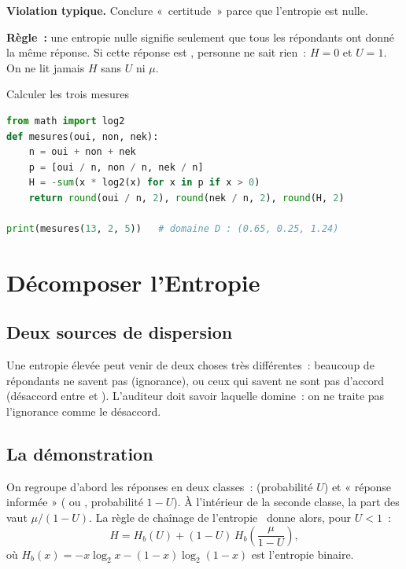\begin{boxalert}
\textbf{Violation typique.} Conclure «~certitude~» parce que l'entropie est
nulle.

\smallskip
\textbf{Règle~:} une entropie nulle signifie seulement que tous les
répondants ont donné la même réponse. Si cette réponse est \NEK{}, personne
ne sait rien~: $H = 0$ et $U = 1$. On ne lit jamais $H$ sans $U$ ni $\mu$.
\end{boxalert}

\begin{boxoutils}{Calculer les trois mesures}
\begin{lstlisting}[language=Python]
from math import log2
def mesures(oui, non, nek):
    n = oui + non + nek
    p = [oui / n, non / n, nek / n]
    H = -sum(x * log2(x) for x in p if x > 0)
    return round(oui / n, 2), round(nek / n, 2), round(H, 2)

print(mesures(13, 2, 5))   # domaine D : (0.65, 0.25, 1.24)
\end{lstlisting}
\end{boxoutils}

\section{Décomposer l'Entropie}
\label{sec:c11-decomp}

\subsection{Deux sources de dispersion}

Une entropie élevée peut venir de deux choses très différentes~: beaucoup
de répondants ne savent pas (ignorance), ou ceux qui savent ne sont pas
d'accord (désaccord entre \OUI{} et \NON{}). L'auditeur doit savoir
laquelle domine~: on ne traite pas l'ignorance comme le désaccord.

\subsection{La démonstration}

On regroupe d'abord les réponses en deux classes~: \NEK{} (probabilité $U$)
et « réponse informée » (\OUI{} ou \NON{}, probabilité $1 - U$). À
l'intérieur de la seconde classe, la part des \OUI{} vaut $\mu / (1 - U)$.
La règle de chaînage de l'entropie~\cite{shannon1948,cover2006elements}
donne alors, pour $U < 1$~:
\[
    H = H_b(U) + (1 - U)\, H_b\!\left(\frac{\mu}{1 - U}\right),
\]
où $H_b(x) = -x\log_2 x - (1-x)\log_2(1-x)$ est l'entropie binaire.

